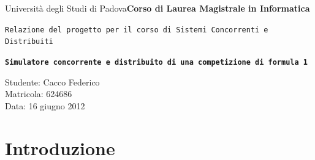 \documentclass[a4paper,11pt, twoside]{book}
\begin{document}
  \thispagestyle{empty}
    
  \begin{flushright}
    {Università degli Studi di Padova}\linebreak[1]
    \textbf{Corso di Laurea \linebreak Magistrale in Informatica} \linebreak \linebreak \linebreak \linebreak
  \end{flushright}
  
  \begin{center}
    {\texttt{Relazione del progetto per il corso di Sistemi Concorrenti e Distribuiti \linebreak \linebreak \linebreak \linebreak \linebreak}}
  \end{center}
  
  \begin{center}
    \texttt{\huge{\textbf{Simulatore concorrente e distribuito di una competizione di formula 1}}} \linebreak \linebreak \linebreak \linebreak \linebreak \linebreak \linebreak \linebreak \linebreak
  \end{center}
  
  
  \begin{flushleft}
    Studente: Cacco Federico\\Matricola: 624686\\Data: 16 giugno 2012
  \end{flushleft}

  \newpage
  \setcounter{page}{1}

  \tableofcontents
  \newpage
  
  \chapter{Introduzione}
    \setcounter{page}{1}
    
\end{document}
